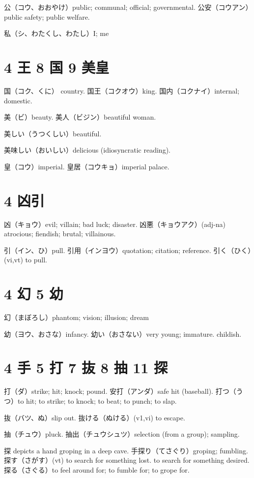 公（コウ、おおやけ）public; communal; official; governmental.
公安（コウアン）public safety; public welfare.

私（シ、わたくし、わたし）I; me

\section{4 王 8 国 9 美皇}

国（コク、くに） country.
国王（コクオウ）king.
国内（コクナイ）internal; domestic.

美（ビ）beauty.
美人（ビジン）beautiful woman.

美しい（うつくしい）beautiful.

美味しい（おいしい）delicious (idiosyncratic reading).

皇（コウ）imperial.
皇居（コウキョ）imperial palace.

\section{4 凶引}

凶（キョウ）evil; villain; bad luck; disaster.
凶悪（キョウアク）(adj-na) atrocious; fiendish; brutal; villainous.

引（イン、ひ）pull.
引用（インヨウ）quotation; citation; reference.
引く（ひく）(vi,vt) to pull.

\section{4 幻 5 幼}

幻（まぼろし）phantom; vision; illusion; dream

幼（ヨウ、おさな）infancy.
幼い（おさない）very young; immature. childish.

\section{4 手 5 打 7 抜 8 抽 11 探}

打（ダ）strike; hit; knock; pound.
安打（アンダ）safe hit (baseball).
打つ（うつ）to hit; to strike; to knock; to beat; to punch; to slap.

抜（バツ、ぬ）slip out.
抜ける（ぬける）(v1,vi) to escape.

抽（チュウ）pluck.
抽出（チュウシュツ）selection (from a group); sampling.

探 depicts a hand groping in a deep cave.
手探り（てさぐり）groping; fumbling.
探す（さがす）(vt)
to search for something lost.
to search for something desired.
探る（さぐる）to feel around for; to fumble for; to grope for.

